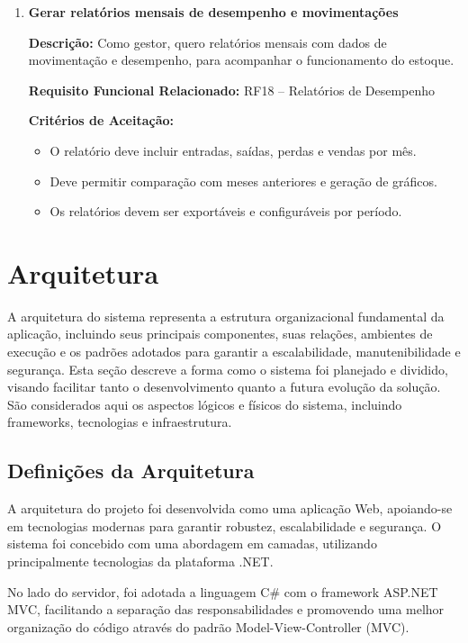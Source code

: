 \documentclass[
	12pt,				%
	openany,			%
	twoside,			%
	a4paper,			%
	english,			%
	brazil				%
	]{abntex2}
\begin{document}
\begin{enumerate}
\item \textbf{Gerar relatórios mensais de desempenho e movimentações}

\textbf{Descrição:} Como gestor, quero relatórios mensais com dados de movimentação e desempenho, para acompanhar o funcionamento do estoque.

\textbf{Requisito Funcional Relacionado:} RF18 -- Relatórios de Desempenho

\textbf{Critérios de Aceitação:}
\begin{itemize}
  \item O relatório deve incluir entradas, saídas, perdas e vendas por mês.
  \item Deve permitir comparação com meses anteriores e geração de gráficos.
  \item Os relatórios devem ser exportáveis e configuráveis por período.
\end{itemize}

\end{enumerate}
\section{Arquitetura}

A arquitetura do sistema representa a estrutura organizacional fundamental da aplicação, incluindo seus principais componentes, suas relações, ambientes de execução e os padrões adotados para garantir a escalabilidade, manutenibilidade e segurança. Esta seção descreve a forma como o sistema foi planejado e dividido, visando facilitar tanto o desenvolvimento quanto a futura evolução da solução. São considerados aqui os aspectos lógicos e físicos do sistema, incluindo frameworks, tecnologias e infraestrutura.


\subsection{Definições da Arquitetura}

A arquitetura do projeto foi desenvolvida como uma aplicação Web, apoiando-se em tecnologias modernas para garantir robustez, escalabilidade e segurança. O sistema foi concebido com uma abordagem em camadas, utilizando principalmente tecnologias da plataforma .NET.

No lado do servidor, foi adotada a linguagem C\# com o framework ASP.NET MVC, facilitando a separação das responsabilidades e promovendo uma melhor organização do código através do padrão Model-View-Controller (MVC).
\end{document}
